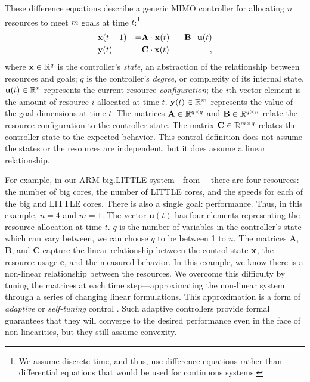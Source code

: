 These difference equations describe a generic MIMO controller for
allocating $n$ resources to meet $m$ goals at time $t$:\footnote{We
  assume discrete time, and thus, use difference equations rather than
  differential equations that would be used for continuous systems.}
\begin{equation}
\begin{aligned}
&\mathbf{x}(t+1) &=& \mathbf{A} \cdot \mathbf{x}(t)& + \mathbf{B} \cdot \mathbf{u}(t)\\
&\mathbf{y}(t)   &=& \mathbf{C} \cdot \mathbf{x}(t)&,
\end{aligned}
\label{eqn:system:mimo}
\end{equation}
where $\mathbf{x} \in \mathbb{R}^{q}$ is the controller's \emph{state}, an abstraction
of the relationship between resources and goals; $q$ is the
controller's \emph{degree}, or complexity of its internal state.
$\mathbf{u}(t) \in \mathbb{R}^n$ represents the current resource
\emph{configuration}; \ie{} the $i$th vector element is the amount of
resource $i$ allocated at time $t$.  $\mathbf{y}(t) \in \mathbb{R}^{m}$ represents the
value of the goal dimensions at time $t$. The matrices $\mathbf{A} \in
\mathbb{R}^{q \times q}$ and $\mathbf{B} \in \mathbb{R}^{q \times n}$ relate the
resource configuration to the controller state.  The matrix
$\mathbf{C} \in \mathbb{R}^{m \times q}$ relates the controller state to the
expected behavior.  This control definition does not assume the states
or the resources are independent, but it does assume a linear
relationship.

For example, in our ARM big.LITTLE system---from
---there are four resources: the number of big cores,
the number of LITTLE cores, and the speeds for each of the big and
LITTLE cores.  There is also a single goal: performance.  Thus, in
this example, $n=4$ and $m=1$. The vector $\mathbf{u}(t)$ has four
elements representing the resource allocation at time $t$. $q$ is the
number of variables in the controller's state which can vary between,
we can choose $q$ to be between 1 to $n$.  The matrices $\mathbf{A}$,
$\mathbf{B}$, and $\mathbf{C}$ capture the linear relationship between
the control state $\mathbf{x}$, the resource usage $\mathbf{c}$, and the
measured behavior.  In this example, we know there is a non-linear
relationship between the resources.  We overcome this difficulty by
tuning the matrices at each time step---approximating the non-linear
system through a series of changing linear formulations.  This
approximation is a form of \emph{adaptive} or \emph{self-tuning}
control \cite{HandbookControl}.  Such adaptive controllers provide
formal guarantees that they will converge to the desired performance
even in the face of non-linearities, but they still assume convexity.

